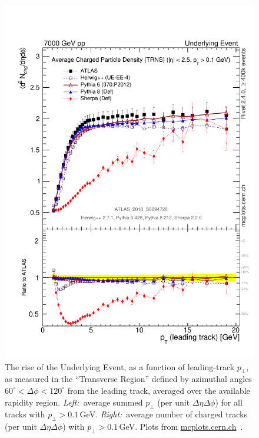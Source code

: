\begin{figure}[t]
  \includegraphics[scale=0.38]{uemb-hard-nch-vs-pt.pdf}
  \caption{The rise of the Underlying Event, as a function of leading-track $p_\perp$, as measured in the ``Transverse Region'' defined by azimuthal angles $60^\circ< \Delta\phi <120^\circ$ from the leading track, averaged over the available rapidity region. {\sl Left:}~average summed $p_\perp$ (per unit $\Delta\eta\Delta\phi$) for all tracks with $p_\perp>0.1$\,GeV. {\sl Right:}~average number of charged tracks (per unit $\Delta\eta\Delta\phi$) with $p_\perp>0.1$\,GeV. 
    Plots from  \href{http://mcplots.cern.ch}{mcplots.cern.ch}~\cite{Karneyeu:2013aha}.\label{fig:UElevel}}
\end{figure}

